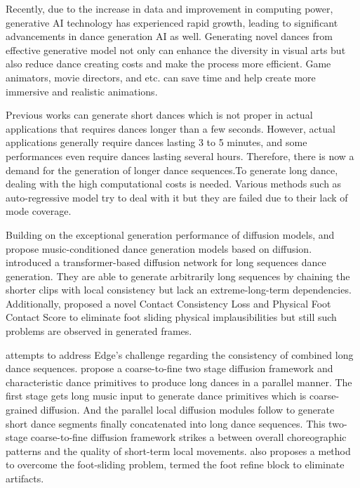 
Recently, due to the increase in data and improvement in computing power, generative AI technology has experienced rapid growth, leading to significant advancements in dance generation AI as well. Generating novel dances from effective generative model not only can enhance the diversity in visual arts but also reduce dance creating costs and make the process more efficient. Game animators, movie directors, and etc. can save time and help create more immersive and realistic animations.

Previous works \cite{kim2022brand2, ofli2011learn2dance, siyao2022bailando, zhou2019dance} can generate short dances which is not proper in actual applications that requires dances longer than a few seconds. However, actual applications generally require dances lasting 3 to 5 minutes, and some performances even require dances lasting several hours. Therefore, there is now a demand for the generation of longer dance sequences.To generate long dance, dealing with the high computational costs is needed. Various methods such as auto-regressive model \cite{huang2020dance, li2021ai, zhuang2022music2dance, valle2021transflower}  try to deal with it but they are failed due to their lack of mode coverage. 

Building on the exceptional generation performance of diffusion models, \cite{tseng2023edge} and \cite{li2024lodge} propose music-conditioned dance generation models based on diffusion. \cite{tseng2023edge} introduced a transformer-based diffusion network for long sequences dance generation. They are able to generate arbitrarily long sequences by chaining the shorter clips with local consistency but lack an extreme-long-term dependencies. Additionally, \cite{tseng2023edge} proposed a novel Contact Consistency Loss and Physical Foot Contact Score to eliminate foot sliding physical implausibilities but still such problems are observed in generated frames.

\cite{li2024lodge} attempts to address Edge's challenge regarding the consistency of combined long dance sequences. \cite{li2024lodge} propose a coarse-to-fine two stage diffusion framework and characteristic dance primitives to produce long dances in a parallel manner. The first stage gets long music input to generate dance primitives which is coarse-grained diffusion. And the parallel local diffusion modules follow to generate short dance segments finally concatenated into long dance sequences. This two-stage coarse-to-fine diffusion framework strikes a between overall choreographic patterns and the quality of short-term local movements. \cite{li2024lodge} also proposes a method to overcome the foot-sliding problem, termed the foot refine block to eliminate artifacts.

